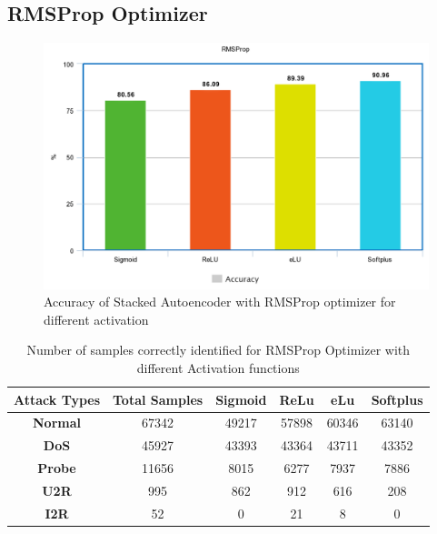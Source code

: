 \documentclass[12pt, a4paper]{report}
\begin{document}
\begin{appendices}
	
	
   \section{RMSProp Optimizer}
   \begin{figure}[h]
\centering
\captionsetup{justification=centering,margin=2cm}
\includegraphics[width=13cm]{accuracy_rmsprop_tflearn.png}
\caption{ Accuracy of Stacked Autoencoder with RMSProp optimizer for different activation }
\label{fig:acc_rms}
\end{figure}
\clearpage
\begin{table}[h]
\centering
\captionsetup{justification=centering,margin=2cm}
\begin{tabular}{|c|c|c|c|c|c|}
\hline
\textbf{Attack Types} & \textbf{Total Samples} & \textbf{Sigmoid} & \textbf{ReLu} & \textbf{eLu} & \textbf{Softplus} \\ \hline
\textbf{Normal}       & 67342                  & 49217            & 57898         & 60346        & 63140             \\ \hline
\textbf{DoS}          & 45927                  & 43393            & 43364         & 43711        & 43352             \\ \hline
\textbf{Probe}        & 11656                  & 8015             & 6277          & 7937         & 7886              \\ \hline
\textbf{U2R}          & 995                    & 862              & 912           & 616          & 208               \\ \hline
\textbf{I2R}          & 52                     & 0               & 21            & 8           & 0                \\ \hline
\end{tabular}
\caption{Number of samples correctly identified for RMSProp Optimizer with different Activation functions}
\label{confusion_rms_tflearn}
\end{table}



\end{appendices}
\end{document}
